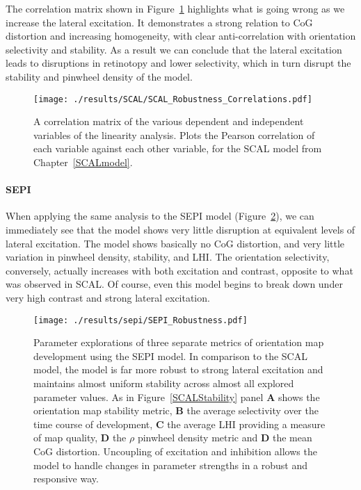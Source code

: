 The correlation matrix shown in Figure~\ref{SCALRobustnessCorr}
highlights what is going wrong as we increase the lateral
excitation. It demonstrates a strong relation to CoG distortion and
increasing homogeneity, with clear anti-correlation with orientation
selectivity and stability. As a result we can conclude that the
lateral excitation leads to disruptions in retinotopy and lower
selectivity, which in turn disrupt the stability and pinwheel density
of the model.

\begin{figure}
	\centering
    \texttt{[image: ./results/SCAL/SCAL\_Robustness\_Correlations.pdf]}
	\caption{A correlation matrix of the various dependent and
      independent variables of the linearity analysis. Plots the
      Pearson correlation of each variable against each other
      variable, for the SCAL model from Chapter~\ref{SCALmodel}.}
	\label{SCALRobustnessCorr}
\end{figure}

\paragraph{SEPI}

When applying the same analysis to the SEPI model
(Figure~\ref{SEPIStability}), we can immediately see that the model
shows very little disruption at equivalent levels of lateral
excitation.  The model shows basically no CoG distortion, and very
little variation in pinwheel density, stability, and LHI. The
orientation selectivity, conversely, actually increases with both
excitation and contrast, opposite to what was observed in SCAL. Of
course, even this model begins to break down under very high contrast
and strong lateral excitation.

\begin{figure}
	\centering
        \texttt{[image: ./results/sepi/SEPI\_Robustness.pdf]}
	\caption{Parameter explorations of three separate metrics of
      orientation map development using the SEPI model. In comparison
      to the SCAL model, the model is far more robust to strong
      lateral excitation and maintains almost uniform stability across
      almost all explored parameter values. As in
      Figure~\ref{SCALStability} panel \textbf{A} shows the
      orientation map stability metric, \textbf{B} the average
      selectivity over the time course of development, \textbf{C} the
      average LHI providing a measure of map quality, \textbf{D} the
      $\rho$ pinwheel density metric and \textbf{D} the mean CoG
      distortion. Uncoupling of excitation and inhibition allows the
      model to handle changes in parameter strengths in a robust and
      responsive way.}
	\label{SEPIStability}
\end{figure}

